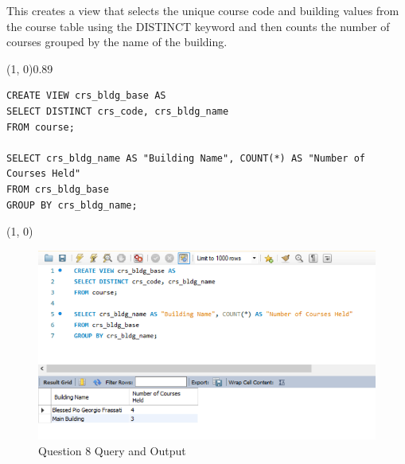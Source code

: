 
This creates a view that selects the unique course code and building values from the course table using the DISTINCT keyword and then counts the number of courses grouped by the name of the building. 
\vspace{\baselineskip}

\sol{}
\noindent\line(1, 0){0.89\linewidth}
\begin{verbatim}
CREATE VIEW crs_bldg_base AS
SELECT DISTINCT crs_code, crs_bldg_name
FROM course;

SELECT crs_bldg_name AS "Building Name", COUNT(*) AS "Number of Courses Held"
FROM crs_bldg_base
GROUP BY crs_bldg_name;
\end{verbatim}
\noindent\line(1, 0){\linewidth}

\begin{figure}[H]
    \centering
    \includegraphics[width=0.7\linewidth]{images/q8.png}
    \caption{Question 8 Query and Output}
\end{figure}
